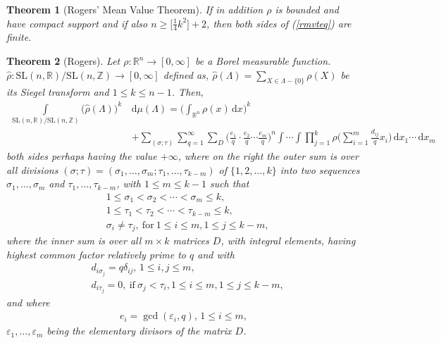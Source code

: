 \documentclass[11pt]{article}
\newtheorem{theorem}{Theorem}[section]
\theoremstyle{definition}
\theoremstyle{proof}
\begin{document}
\begin{theorem}[Rogers' Mean Value Theorem]
    If in addition $\rho$ is bounded and have compact support and if also $n \geq  \big[\frac{1}{4} k ^2\big] + 2$, then both sides of (\ref{rmvteq}) are finite.
\end{theorem}

\begin{theorem}[Rogers]\label{mst}
    Let $ \rho : \mathbb{R}^{n} \to [0, \infty]$ be a Borel measurable function.
    $\widehat{\rho } : \mathrm{SL}(n,\mathbb{R})/\mathrm{SL}(n,\mathbb{Z}) \to [0, \infty]$ defined as, $\widehat{\rho } (\Lambda ) = \displaystyle\sum_{X \in \Lambda - \{0\}} \rho (X)$ be its Siegel transform and $1 \leq  k \leq n-1$.
    Then,
    \begin{equation}\label{msteq}
        \begin{split}
            \int\limits_{\mathrm{SL}(n,\mathbb{R})/\mathrm{SL}(n,\mathbb{Z})} {\big(\widehat{\rho }(\Lambda )\big)}^k \,&  \mathrm{d} \mu (\Lambda ) = \bigg(\int_{\mathbb{R}^{n}} \rho (x) \,  \mathrm{d} x\bigg)^k \\
            & + \sum_{(\sigma ; \tau )} \sum_{q=1}^{\infty}\sum_{D} {\bigg(\frac{e_1}{q} \cdot \frac{e_2}{q} \cdots \frac{e_m}{q} \bigg)}^n \int \cdots \int \prod_{j=1}^{k}\rho \bigg(\sum_{i=1}^{m}\frac{d_{ij}}{q} x_i\bigg) \, \mathrm{d} x_1 \cdots \, \mathrm{d} x_m
        \end{split}
    \end{equation}
    both sides perhaps having the value $+\infty$, where on the right the outer sum is over all divisions $(\sigma ; \tau ) = (\sigma _1, \ldots, \sigma _m; \tau _1, \ldots, \tau _{k-m})$ of $\{1, 2, \ldots , k\}$ into two sequences $\sigma _1, \ldots , \sigma _m$ and $\tau _1, \ldots , \tau _{k-m}$, with $1\leq m \leq k-1$ such that
    \begin{align*}
        & 1 \leq \sigma _1 < \sigma _2 < \cdots < \sigma _m \leq  k, \\
        & 1 \leq  \tau _1 < \tau _2 < \cdots < \tau _{k-m} \leq  k, \\
        & \sigma _i \neq \tau _j, \ \text{for} \ 1 \leq  i \leq  m, 1\leq  j\leq  k-m,
    \end{align*}
    where the inner sum is over all $m \times k$ matrices $D$, with integral elements, having highest common factor relatively prime to $q$ and with
    \begin{equation}\label{mstD}
        \begin{split}
            & d_{i \sigma _j} = q \delta _{ij}, \, 1 \leq  i, j \leq  m,\\
            & d_{i \tau _j} = 0, \ \text{if} \ \sigma _j < \tau _i, 1 \leq  i \leq m , 1\leq  j \leq  k-m,
        \end{split}
    \end{equation}
    and where
    \begin{align*}
        e_i = \gcd (\varepsilon _i, q), \, 1 \leq  i \leq  m,
    \end{align*}
    $\varepsilon _1, \ldots , \varepsilon _m$ being the elementary divisors of the matrix $D$.


\end{theorem}
\end{document}
